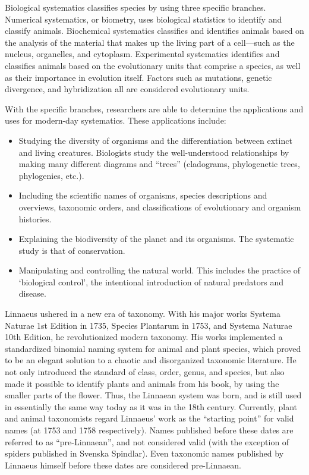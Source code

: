 Biological systematics classifies species by using three specific branches. Numerical systematics, or biometry, uses biological statistics to identify and classify animals. Biochemical systematics classifies and identifies animals based on the analysis of the material that makes up the living part of a cell---such as the nucleus, organelles, and cytoplasm. Experimental systematics identifies and classifies animals based on the evolutionary units that comprise a species, as well as their importance in evolution itself. Factors such as mutations, genetic divergence, and hybridization all are considered evolutionary units.

With the specific branches, researchers are able to determine the applications and uses for modern-day systematics. These applications include:

\begin{itemize}
\tightlist
\item
  Studying the diversity of organisms and the differentiation between extinct and living creatures. Biologists study the well-understood relationships by making many different diagrams and ``trees'' (cladograms, phylogenetic trees, phylogenies, etc.).
\item
  Including the scientific names of organisms, species descriptions and overviews, taxonomic orders, and classifications of evolutionary and organism histories.
\item
  Explaining the biodiversity of the planet and its organisms. The systematic study is that of conservation.
\item
  Manipulating and controlling the natural world. This includes the practice of `biological control', the intentional introduction of natural predators and disease.
\end{itemize}

Linnaeus ushered in a new era of taxonomy. With his major works Systema Naturae 1st Edition in 1735, Species Plantarum in 1753, and Systema Naturae 10th Edition, he revolutionized modern taxonomy. His works implemented a standardized binomial naming system for animal and plant species, which proved to be an elegant solution to a chaotic and disorganized taxonomic literature. He not only introduced the standard of class, order, genus, and species, but also made it possible to identify plants and animals from his book, by using the smaller parts of the flower. Thus, the Linnaean system was born, and is still used in essentially the same way today as it was in the 18th century. Currently, plant and animal taxonomists regard Linnaeus' work as the ``starting point'' for valid names (at 1753 and 1758 respectively). Names published before these dates are referred to as ``pre-Linnaean'', and not considered valid (with the exception of spiders published in Svenska Spindlar). Even taxonomic names published by Linnaeus himself before these dates are considered pre-Linnaean.

